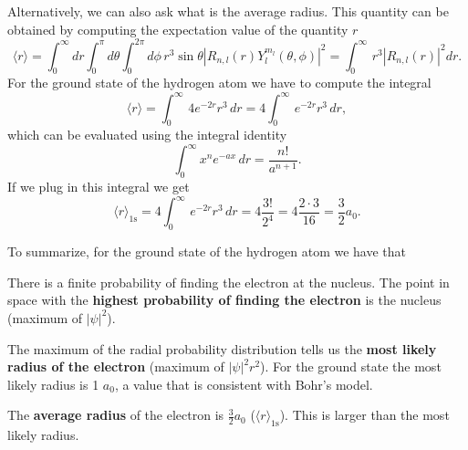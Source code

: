 \documentclass[../Main/chem331-notes.tex]{subfiles}
\begin{document}
Alternatively, we can also ask what is the average radius. This quantity can be obtained by computing the expectation value of the quantity $r$
\begin{equation}
\langle r \rangle = \int_{0}^{\infty} dr
\int_{0}^{\pi} d\theta
\int_{0}^{2\pi} d\phi \,r^3 \sin \theta |R_{n,l}(r) Y_l^{m_l}(\theta,\phi)|^2
= \int_{0}^{\infty} \,r^3 |R_{n,l}(r)|^2 dr.
\end{equation}
For the ground state of the hydrogen atom we have to compute the integral
\begin{equation}
\langle r \rangle = \int_{0}^{\infty} \, 4 e^{-2r} r^3 \, dr = 4 \int_{0}^{\infty} \, e^{-2r} r^3 \, dr,
\end{equation}
which can be evaluated using the integral identity
\begin{equation}
\int_{0}^{\infty} x^n e^{-ax}  \, dr = \frac{n!}{a^{n+1}}.
\end{equation}
If we plug in this integral we get
\begin{equation}
\langle r \rangle_{1\mathrm{s}} = 4 \int_{0}^{\infty} \, e^{-2r} r^3 \, dr = 4 \frac{3!}{2^4} = 4 \frac{2 \cdot 3}{16} = \frac{3}{2} a_0.
\end{equation}


To summarize, for the ground state of the hydrogen atom we have that
\begin{ibox}
\begin{myitems}
\item There is a finite probability of finding the electron at the nucleus. The point in space with the \textbf{highest probability of finding the electron} is the nucleus (maximum of $|\psi|^2$).
\item The maximum of the radial probability distribution tells us the \textbf{most likely radius of the electron}  (maximum of $|\psi|^2 r^2$). For the ground state the most likely radius is 1 $a_0$, a value that is consistent with Bohr's model.
\item The \textbf{average radius} of the electron is $\frac{3}{2} a_0$ ($\langle r \rangle_{1\mathrm{s}}$). This is larger than the most likely radius.
\end{myitems}
\end{ibox}
\end{document}
